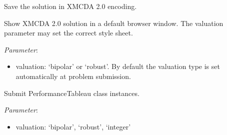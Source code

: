 \documentclass[letterpaper,10pt,english]{sphinxmanual}
\begin{document}
\begin{fulllineitems}
\begin{fulllineitems}
\label{techDoc:outrankingDigraphs.RubisRestServer.ping}
\end{fulllineitems}


\begin{fulllineitems}
\label{techDoc:outrankingDigraphs.RubisRestServer.saveXMCDA2Solution}
Save the solution in XMCDA 2.0 encoding.

\end{fulllineitems}


\begin{fulllineitems}
\label{techDoc:outrankingDigraphs.RubisRestServer.showSolution}
Show XMCDA 2.0 solution in a default browser window.
The valuation parameter may set the correct style sheet.

\emph{Parameter}:
\begin{itemize}
\item {} 
valuation: `bipolar' or `robust'.
By default the valuation type is set
automatically at problem submission.

\end{itemize}

\end{fulllineitems}


\begin{fulllineitems}
\label{techDoc:outrankingDigraphs.RubisRestServer.submitProblem}
Submit PerformanceTableau class instances.

\emph{Parameter}:
\begin{itemize}
\item {} 
valuation: `bipolar', `robust', `integer'

\end{itemize}

\end{fulllineitems}


\end{fulllineitems}
\end{document}
